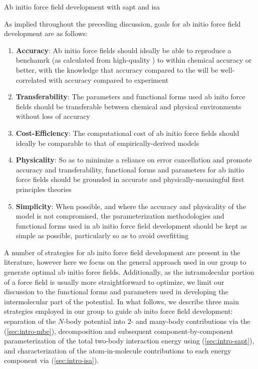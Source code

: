 \begin{section}{Ab initio force field development with \acrshort{sapt} and
\acrshort{isa}}

As implied throughout the preceding discussion, goals for ab
initio force field development are as follows:
\begin{enumerate}
\item \textbf{Accuracy}: 
Ab initio force fields should
ideally be able to reproduce a benchamrk \pes (as calculated from high-quality
\est) to within chemical accuracy or better, with the knowledge that accuracy
compared to the \pes will be well-correlated with accuracy compared to
experiment
\item \textbf{Transferability}: The parameters and
functional forms used ab inito force fields should be transferable between
chemical and physical environments without loss of accuracy
\item \textbf{Cost-Efficiency}: 
The computational cost of ab initio force fields should ideally be comparable to that
of empirically-derived models
\item \textbf{Physicality}: So as to minimize a reliance on error cancellation
and promote accuracy and transferability, functional forms and parameters for
ab initio force fields should be grounded in accurate and
physically-meaningful first principles theories
\item \textbf{Simplicity}: When possible, and where the accuracy and
physicality of the model is not compromised, the parameterization methodologies
and functional forms used in ab initio force field development should be kept
as simple as possible, particularly so as to avoid overfitting
\end{enumerate}

A number of strategies for ab inito force field development are present in the
literature,\cite{Stone2007,Ballone2014} however here we focus on the general
approach used in our group\cite{Schmidt2015} to generate
optimal ab initio force fields. Additionally,
as the intramolecular portion of a force field is
usually more straightforward to optimize,\cite{} we limit our discussion to
the functional forms and parameters used in developing the intermolecular part
of the potential.
In what follows, we describe three main strategies employed in our group to
guide ab inito force field development: separation of the $N$-body
potential into 2- and many-body contributions via the \mbe (\cref{sec:intro-mbe}), decomposition and
subsequent component-by-component parameterization of the total two-body
interaction energy using \sapt (\cref{sec:intro-sapt}), and characterization
of the atom-in-molecule contributions to each energy component via \isa
(\cref{sec:intro-isa}).


\end{section}
